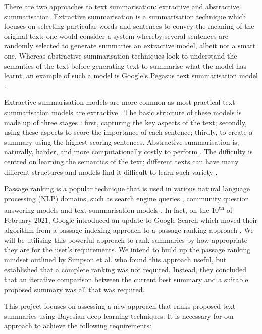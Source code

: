 \documentclass[ %
                    author={James Stephenson},
                supervisor={Dr. Edwin Simpson},
                    degree={MSc},
                     title={PROJECT PLAN},
                  subtitle={ Bayesian Deep Learning For Extractive Test Summarisation},
                      type={},
                      year={2022}]{../additions/dissertation}
\begin{document}
		\medbreak
		There are two approaches to text summarisation: extractive and abstractive summarisation. Extractive summarisation is a summarisation technique which focuses on selecting particular words and sentences to convey the meaning of the original text; one would consider a system whereby several sentences are randomly selected to generate summaries an extractive model, albeit not a smart one. Whereas abstractive summarisation techniques look to understand the semantics of the text before generating text to summarise what the model has learnt; an example of such a model is Google's Pegasus text summarisation model \cite{Zhao19}.

		\medbreak
		Extractive summarisation models are more common as most practical text summarisation models are extractive \cite{Gudivada15}. The basic structure of these models is made up of three stages \cite{Nenkova11}: first, capturing the key aspects of the text; secondly, using these aspects to score the importance of each sentence; thirdly, to create a summary using the highest scoring sentences. Abstractive summarisation is, naturally, harder, and more computationally costly to perform \cite{Gudivada15}. The difficulty is centred on learning the semantics of the text; different texts can have many different structures and models find it difficult to learn such variety \cite{Zhu21}.
		
		\medbreak
		Passage ranking is a popular technique that is used in various natural language processing (NLP) domains, such as search engine queries \cite{Chang20}, community question answering models \cite{Lin17} and text summarisation models \cite{Simpson19}. In fact, on the 10\textsuperscript{th} of February 2021, Google introduced an update to Google Search which moved their algorithm from a passage indexing approach to a passage ranking approach \cite{Seround21}. We will be utilising this powerful approach to rank summaries by how appropriate they are for the user's requirements. We intend to build up the passage ranking mindset outlined by Simpson et al. \cite{Simpson19} who found this approach useful, but established that a complete ranking was not required. Instead, they concluded that an iterative comparison between the current best summary and a suitable proposed summary was all that was required.

		\medbreak
		This project focuses on assessing a new approach that ranks proposed text summaries using Bayesian deep learning techniques. It is necessary for our approach to achieve the following requirements:
\end{document}
